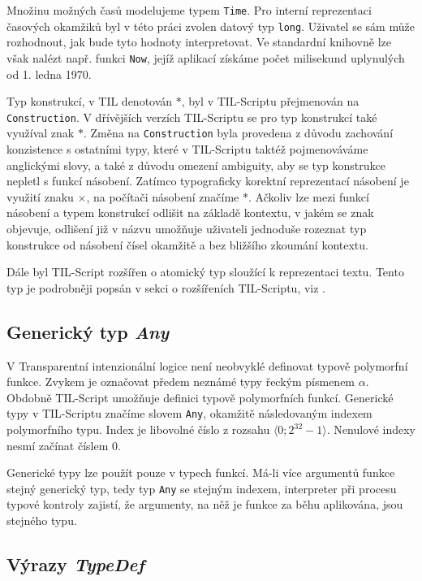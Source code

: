Množinu možných časů modelujeme typem \lstinline{Time}. Pro interní reprezentaci časových okamžiků
byl v této práci zvolen datový typ \lstinline{long}. Uživatel se sám může rozhodnout, jak bude tyto
hodnoty interpretovat. Ve standardní knihovně lze však nalézt např. funkci \lstinline{Now}, jejíž
aplikací získáme počet milisekund uplynulých od 1. ledna 1970.

Typ konstrukcí, v TIL denotován $*$, byl v TIL-Scriptu přejmenován na \lstinline{Construction}.
V dřívějších verzích TIL-Scriptu se pro typ konstrukcí také využíval znak $*$. Změna na
\lstinline{Construction} byla provedena z důvodu zachování konzistence s ostatními typy, které
v TIL-Scriptu taktéž pojmenováváme anglickými slovy, a také z důvodu omezení ambiguity, aby se typ
konstrukce nepletl s funkcí násobení. Zatímco typograficky korektní reprezentací násobení je
využití znaku $\times$, na počítači násobení značíme $*$. Ačkoliv lze mezi funkcí násobení a
typem konstrukcí odlišit na základě kontextu, v jakém se znak objevuje, odlišení již v názvu
umožňuje uživateli jednoduše rozeznat typ konstrukce od násobení čísel okamžitě a bez bližšího
zkoumání kontextu.

Dále byl TIL-Script rozšířen o atomický typ sloužící k reprezentaci textu. Tento typ je podrobněji
popsán v sekci o rozšířeních TIL-Scriptu, viz .

\subsection{Generický typ \textit{Any}}

V Transparentní intenzionální logice není neobvyklé definovat typově polymorfní funkce. Zvykem je
označovat předem neznámé typy řeckým písmenem $\alpha$. Obdobně TIL-Script umožňuje definici
typově polymorfních funkcí. Generické typy v TIL-Scriptu značíme slovem \lstinline{Any}, okamžitě
následovaným indexem polymorfního typu. Index je libovolné číslo z rozsahu
$\bigl \langle 0; 2^{32}-1 \bigr \rangle$. Nenulové indexy nesmí začínat číslem 0.

Generické typy lze použít pouze v typech funkcí. Má-li více argumentů funkce stejný generický
typ, tedy typ \lstinline{Any} se stejným indexem, interpreter při procesu typové kontroly zajistí,
že argumenty, na něž je funkce za běhu aplikována, jsou stejného typu.

\subsection{Výrazy \textit{TypeDef}}

